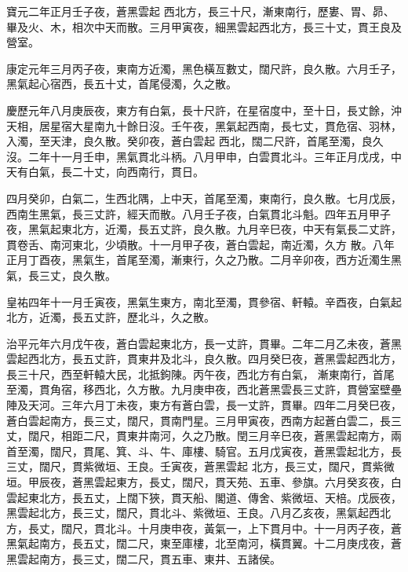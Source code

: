 \begin{pinyinscope}
 寶元二年正月壬子夜，蒼黑雲起
 西北方，長三十尺，漸東南行，歷婁、胃、昴、畢及火、木，相次中天而散。三月甲寅夜，細黑雲起西北方，長三十丈，貫王良及營室。



 康定元年三月丙子夜，東南方近濁，黑色橫亙數丈，闊尺許，良久散。六月壬子，黑氣起心宿西，長五十丈，首尾侵濁，久之散。



 慶歷元年八月庚辰夜，東方有白氣，長十尺許，在星宿度中，至十日，長丈餘，沖天相，居星宿大星南九十餘日沒。壬午夜，黑氣起西南，長七丈，貫危宿、羽林，入濁，至天津，良久散。癸卯夜，蒼白雲起
 西北，闊二尺許，首尾至濁，良久沒。二年十一月壬申，黑氣貫北斗柄。八月甲申，白雲貫北斗。三年正月戊戌，中天有白氣，長二十丈，向西南行，貫日。



 四月癸卯，白氣二，生西北隅，上中天，首尾至濁，東南行，良久散。七月戊辰，西南生黑氣，長三丈許，經天而散。八月壬子夜，白氣貫北斗魁。四年五月甲子夜，黑氣起東北方，近濁，長五丈許，良久散。九月辛巳夜，中天有氣長二丈許，貫卷舌、南河東北，少頃散。十一月甲子夜，蒼白雲起，南近濁，久方
 散。八年正月丁酉夜，黑氣生，首尾至濁，漸東行，久之乃散。二月辛卯夜，西方近濁生黑氣，長三丈，良久散。



 皇祐四年十一月壬寅夜，黑氣生東方，南北至濁，貫參宿、軒轅。辛酉夜，白氣起北方，近濁，長五丈許，歷北斗，久之散。



 治平元年六月戊午夜，蒼白雲起東北方，長一丈許，貫畢。二年二月乙未夜，蒼黑雲起西北方，長五丈許，貫東井及北斗，良久散。四月癸巳夜，蒼黑雲起西北方，長三十尺，西至軒轅大民，北抵鉤陳。丙午夜，西北方有白氣，
 漸東南行，首尾至濁，貫角宿，移西北，久方散。九月庚申夜，西北蒼黑雲長三丈許，貫營室壁壘陣及天河。三年六月丁未夜，東方有蒼白雲，長一丈許，貫畢。四年二月癸巳夜，蒼白雲起南方，長三丈，闊尺，貫南門星。三月甲寅夜，西南方起蒼白雲二，長三丈，闊尺，相距二尺，貫東井南河，久之乃散。閏三月辛巳夜，蒼黑雲起南方，兩首至濁，闊尺，貫尾、箕、斗、牛、庫樓、騎官。五月戊寅夜，蒼黑雲起北方，長三丈，闊尺，貫紫微垣、王良。壬寅夜，蒼黑雲起
 北方，長三丈，闊尺，貫紫微垣。甲辰夜，蒼黑雲起東方，長丈，闊尺，貫天苑、五車、參旗。六月癸亥夜，白雲起東北方，長五丈，上闊下狹，貫天船、閣道、傳舍、紫微垣、天棓。戊辰夜，黑雲起北方，長三丈，闊尺，貫北斗、紫微垣、王良。八月乙亥夜，黑氣起西北方，長丈，闊尺，貫北斗。十月庚申夜，黃氣一，上下貫月中。十一月丙子夜，蒼黑氣起南方，長五丈，闊二尺，東至庫樓，北至南河，橫貫翼。十二月庚戌夜，蒼黑雲起南方，長三丈，闊二尺，貫五車、東井、五諸侯。




\end{pinyinscope}
